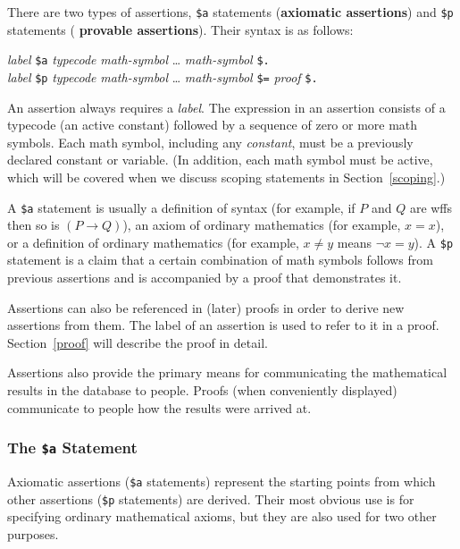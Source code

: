 There are two types of assertions, \texttt{\$a}
statements ({\bf axiomatic assertions}) and \texttt{\$p} statements ({\bf
provable assertions}).  Their syntax is as follows:
\begin{center}
  {\em label} \texttt{\$a} {\em typecode} {\em math-symbol} \ldots
         {\em math-symbol} \texttt{\$.}\\
  {\em label} \texttt{\$p} {\em typecode} {\em math-symbol} \ldots
        {\em math-symbol} \texttt{\$=} {\em proof} \texttt{\$.}
\end{center}
An assertion always requires a {\em label}. The expression in an
assertion consists of a typecode (an active constant)
followed by a sequence of zero
or more math symbols.  Each math symbol, including any {\em constant}, must be a
previously declared constant or variable.  (In addition, each math symbol
must be active, which will be covered when we discuss scoping statements in
Section~\ref{scoping}.)

A \texttt{\$a} statement is usually a definition of syntax (for example, if $P$
and $Q$ are wffs then so is $(P\to Q)$), an axiom of ordinary
mathematics (for example, $x=x$), or a definition of
ordinary mathematics (for example, $x\ne y$ means $\lnot x=y$). A \texttt{\$p}
statement is a claim that a certain combination of math symbols follows from
previous assertions and is accompanied by a proof that demonstrates it.

Assertions can also be referenced in (later) proofs in order to derive new
assertions from them. The label of an assertion is used to refer to it in a
proof. Section~\ref{proof} will describe the proof in detail.

Assertions also provide the primary means for communicating the mathematical
results in the database to people.  Proofs (when conveniently displayed)
communicate to people how the results were arrived at.

\subsubsection{The \texttt{\$a} Statement}

Axiomatic assertions (\texttt{\$a} statements) represent the starting points from
which other assertions (\texttt{\$p} statements) are
derived.  Their most obvious use is for specifying ordinary mathematical
axioms, but they are also used for two other purposes.

